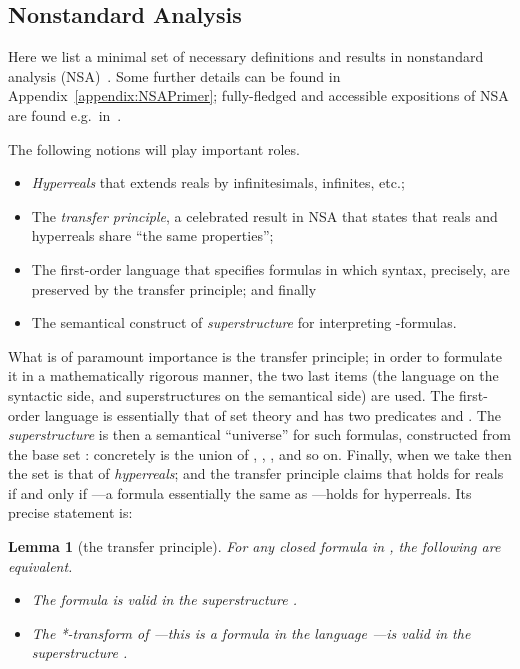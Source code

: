 \documentclass[envcountsect,orivec]{llncs} \pdfoutput=1
\newtheorem{mylem}[mythm]{Lemma}
\theoremstyle{definition}
\begin{document}
\subsection{Nonstandard Analysis}\label{subsec:preliminariesNSA}
Here we list a minimal set of necessary definitions and results in
nonstandard analysis (NSA)~\cite{Robinson1966}.
Some further details 
can be found in Appendix~\ref{appendix:NSAPrimer}; 
fully-fledged and accessible expositions of NSA are 
found e.g.\ in~\cite{Hurd1985, Goldblatt1998}.

The following notions will play important roles.
\begin{itemize}
 \item 
 \emph{Hyperreals} that extends reals by infinitesimals, infinites,
       etc.;
 \item 
 The \emph{transfer principle}, a celebrated result in NSA that states
 that
 reals and hyperreals share ``the same properties''; 
 \item 
 The first-order language  that specifies formulas in which syntax, precisely,
 are preserved by the transfer principle; and finally
 \item 
 The semantical construct of \emph{superstructure} for
 interpreting -formulas.
\end{itemize}
What is of paramount importance is the transfer principle; in order to 
formulate it in a mathematically rigorous manner, 
the two last items (the language  on the syntactic side, and
superstructures on the semantical side) are used.
The first-order language  is essentially that of set theory and has
two predicates  and . The \emph{superstructure}  is
then a semantical ``universe'' for such formulas, constructed from the
base set : concretely  is the union of , ,
, and so on. Finally, when we take  then the
set  is that of \emph{hyperreals}; and the
transfer principle claims that  holds for reals if and only if
---a formula essentially the same as ---holds for
hyperreals.
 Its precise
statement is:
\begin{mylem}[the transfer principle]\label{lemma:transferPrinciplePreview}
 For any closed formula  in , the following are equivalent. 
\begin{itemize}
 \item The formula  is valid in the superstructure .
 \item The \emph{*-transform}  of ---this is a formula in the
       language ---is valid in the superstructure .
\end{itemize}
\end{mylem}
\end{document}
